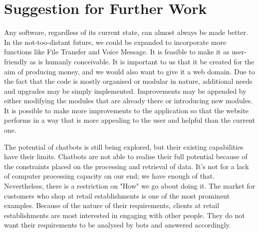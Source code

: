 \goodbreak
\section{Suggestion for Further Work}
Any software, regardless of its current state, can almost always be made better. In the not-too-distant future, we could be expanded to incorporate more functions like File Transfer and Voice Message. It is feasible to make it as user-friendly as is humanly conceivable. It is important to us that it be created for the aim of producing money, and we would also want to give it a web domain. Due to the fact that the code is mostly organised or modular in nature, additional needs and upgrades may be simply implemented. Improvements may be appended by either modifying the modules that are already there or introducing new modules. It is possible to make more improvements to the application so that the website performs in a way that is more appealing to the user and helpful than the current one.

The potential of chatbots is still being explored, but their existing capabilities have their limits. Chatbots are not able to realise their full potential because of the constraints placed on the processing and retrieval of data. It's not for a lack of computer processing capacity on our end; we have enough of that. Nevertheless, there is a restriction on "How" we go about doing it. The market for customers who shop at retail establishments is one of the most prominent examples. Because of the nature of their requirements, clients at retail establishments are most interested in engaging with other people. They do not want their requirements to be analysed by bots and answered accordingly.

